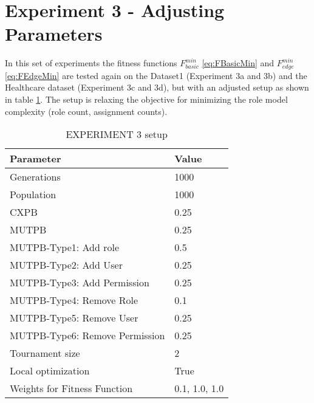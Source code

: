 \section{Experiment 3 - Adjusting Parameters}
\label{sec:exp3}
In this set of experiments the fitness functions $F_{basic}^{min}$ \eqref{eq:FBasicMin} and $F_{edge}^{min}$ \eqref{eq:FEdgeMin} are tested again on the Dataset1 (Experiment 3a and 3b) and the Healthcare dataset (Experiment 3c and 3d), but with an adjusted setup as shown in table \ref{tab:exp3_setup}. The setup is relaxing the objective for minimizing the role model complexity (role count, assignment counts).

\begin{table}[H]
    \centering
    \begin{adjustbox}{width=0.5\textwidth}
	    \begin{tabular}{|l|l|}
	        \hline
	        \rowcolor{myGray} 
	        \textbf{Parameter}              & \textbf{Value}    \\ \hline
	        Generations                     & 1000              \\ \hline
	        Population                      & 1000              \\ \hline
	        CXPB                            & 0.25              \\ \hline
	        MUTPB                           & 0.25              \\ \hline
	        MUTPB-Type1: Add role           & 0.5               \\ \hline
	        MUTPB-Type2: Add User           & 0.25              \\ \hline
	        MUTPB-Type3: Add Permission     & 0.25              \\ \hline
	        MUTPB-Type4: Remove Role        & 0.1               \\ \hline
	        MUTPB-Type5: Remove User        & 0.25              \\ \hline
	        MUTPB-Type6: Remove Permission  & 0.25              \\ \hline
	        Tournament size                 & 2                 \\ \hline
	        Local optimization              & True        		\\ \hline
	        Weights for Fitness Function    & 0.1, 1.0, 1.0     \\ \hline
	    \end{tabular}
	\end{adjustbox}
    \caption{EXPERIMENT 3 setup}
    \label{tab:exp3_setup}
\end{table}

